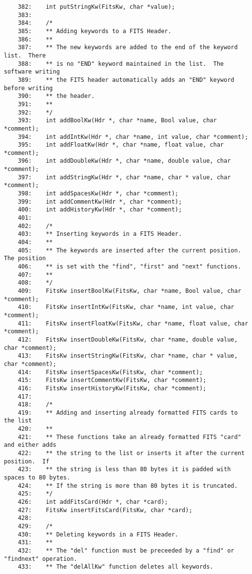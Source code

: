 \begin{scriptsize}
\begin{verbatim}
    382:    int putStringKw(FitsKw, char *value);
    383:    
    384:    /* 
    385:    ** Adding keywords to a FITS Header.
    386:    **
    387:    ** The new keywords are added to the end of the keyword list.  There
    388:    ** is no "END" keyword maintained in the list.  The software writing
    389:    ** the FITS header automatically adds an "END" keyword before writing
    390:    ** the header.
    391:    **
    392:    */
    393:    int addBoolKw(Hdr *, char *name, Bool value, char *comment);
    394:    int addIntKw(Hdr *, char *name, int value, char *comment);
    395:    int addFloatKw(Hdr *, char *name, float value, char *comment);
    396:    int addDoubleKw(Hdr *, char *name, double value, char *comment);
    397:    int addStringKw(Hdr *, char *name, char * value, char *comment);
    398:    int addSpacesKw(Hdr *, char *comment);
    399:    int addCommentKw(Hdr *, char *comment);
    400:    int addHistoryKw(Hdr *, char *comment);
    401:    
    402:    /* 
    403:    ** Inserting keywords in a FITS Header.
    404:    **
    405:    ** The keywords are inserted after the current position.  The position
    406:    ** is set with the "find", "first" and "next" functions.
    407:    **
    408:    */
    409:    FitsKw insertBoolKw(FitsKw, char *name, Bool value, char *comment);
    410:    FitsKw insertIntKw(FitsKw, char *name, int value, char *comment);
    411:    FitsKw insertFloatKw(FitsKw, char *name, float value, char *comment);
    412:    FitsKw insertDoubleKw(FitsKw, char *name, double value, char *comment);
    413:    FitsKw insertStringKw(FitsKw, char *name, char * value, char *comment);
    414:    FitsKw insertSpacesKw(FitsKw, char *comment);
    415:    FitsKw insertCommentKw(FitsKw, char *comment);
    416:    FitsKw insertHistoryKw(FitsKw, char *comment);
    417:    
    418:    /*
    419:    ** Adding and inserting already formatted FITS cards to the list
    420:    **
    421:    ** These functions take an already formatted FITS "card" and either adds
    422:    ** the string to the list or inserts it after the current position.  If
    423:    ** the string is less than 80 bytes it is padded with spaces to 80 bytes.
    424:    ** If the string is more than 80 bytes it is truncated.
    425:    */
    426:    int addFitsCard(Hdr *, char *card);
    427:    FitsKw insertFitsCard(FitsKw, char *card);
    428:    
    429:    /* 
    430:    ** Deleting keywords in a FITS Header. 
    431:    **
    432:    ** The "del" function must be preceeded by a "find" or "findnext" operation.
    433:    ** The "delAllKw" function deletes all keywords.

\end{verbatim}
\end{scriptsize}

